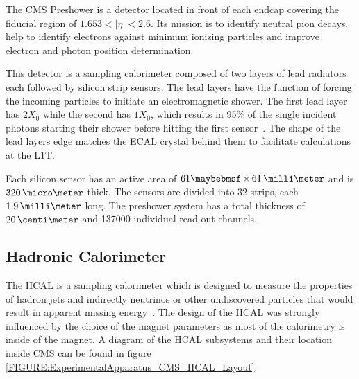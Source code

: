 
The \gls{CMS} Preshower is a detector located in front of each endcap covering the fiducial region of $1.653<|\eta|<2.6$. Its mission is to identify neutral pion decays, help to identify electrons against minimum ionizing particles and improve electron and photon position determination.

This detector is a sampling calorimeter composed of two layers of lead radiators each followed by silicon strip sensors. The lead layers have the function of forcing the incoming particles to initiate an electromagnetic shower. The first lead layer has $2X_0$ while the second has $1X_0$, which results in 95\% of the single incident photons starting their shower before hitting the first sensor~\cite{ARTICLE:TheCMSExperiment}. The shape of the lead layers edge matches the \gls{ECAL} crystal behind them to facilitate calculations at the \gls{L1T}.

Each silicon sensor has an active area of $61 \times 61\,\milli\meter$ and is $320\,\micro\meter$ thick. The sensors are divided into 32 strips, each $1.9\,\milli\meter$ long.  The preshower system has a total thickness of $20\,\centi\meter$ and 137000 individual read-out channels. 

\subsection{Hadronic Calorimeter}
\label{SUBSECTION:ExperimentalApparatus_CMS_HCAL}


The \acrfull{HCAL} is a sampling calorimeter which is designed to measure the properties of hadron jets and indirectly neutrinos or other undiscovered particles that would result in apparent missing energy~\cite{CMSTDR:CMSHCAL}. The design of the \gls{HCAL} was strongly influenced by the choice of the magnet parameters as most of the calorimetry is inside of the magnet. A diagram of the \gls{HCAL} subsystems and their location inside \gls{CMS} can be found in figure \ref{FIGURE:ExperimentalApparatus_CMS_HCAL_Layout}.

